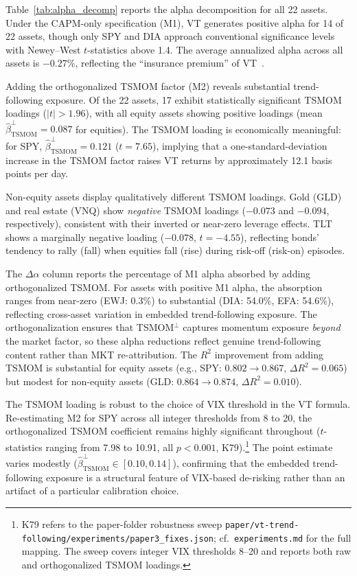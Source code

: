 Table~\ref{tab:alpha_decomp} reports the alpha decomposition for all 22 assets. Under the CAPM-only specification (M1), VT generates positive alpha for 14 of 22 assets, though only SPY and DIA approach conventional significance levels with Newey--West $t$-statistics above 1.4. The average annualized alpha across all assets is $-0.27\%$, reflecting the ``insurance premium'' of VT~\citep{lai2026a}.

Adding the orthogonalized TSMOM factor (M2) reveals substantial trend-following exposure. Of the 22 assets, 17 exhibit statistically significant TSMOM loadings ($|t| > 1.96$), with all equity assets showing positive loadings (mean $\hat{\beta}_{\text{TSMOM}}^{\perp} = 0.087$ for equities). The TSMOM loading is economically meaningful: for SPY, $\hat{\beta}_{\text{TSMOM}}^{\perp} = 0.121$ ($t = 7.65$), implying that a one-standard-deviation increase in the TSMOM factor raises VT returns by approximately 12.1 basis points per day.

Non-equity assets display qualitatively different TSMOM loadings. Gold (GLD) and real estate (VNQ) show \textit{negative} TSMOM loadings ($-0.073$ and $-0.094$, respectively), consistent with their inverted or near-zero leverage effects. TLT shows a marginally negative loading ($-0.078$, $t = -4.55$), reflecting bonds' tendency to rally (fall) when equities fall (rise) during risk-off (risk-on) episodes.

The $\Delta\alpha$ column reports the percentage of M1 alpha absorbed by adding orthogonalized TSMOM. For assets with positive M1 alpha, the absorption ranges from near-zero (EWJ: 0.3\%) to substantial (DIA: 54.0\%, EFA: 54.6\%), reflecting cross-asset variation in embedded trend-following exposure. The orthogonalization ensures that TSMOM$^{\perp}$ captures momentum exposure \textit{beyond} the market factor, so these alpha reductions reflect genuine trend-following content rather than MKT re-attribution. The $R^2$ improvement from adding TSMOM is substantial for equity assets (e.g., SPY: $0.802 \to 0.867$, $\Delta R^2 = 0.065$) but modest for non-equity assets (GLD: $0.864 \to 0.874$, $\Delta R^2 = 0.010$).

The TSMOM loading is robust to the choice of VIX threshold in the VT formula. Re-estimating M2 for SPY across all integer thresholds from 8 to 20, the orthogonalized TSMOM coefficient remains highly significant throughout ($t$-statistics ranging from 7.98 to 10.91, all $p < 0.001$, K79).\footnote{K79 refers to the paper-folder robustness sweep \texttt{paper/vt-trend-following/experiments/paper3\_fixes.json}; cf.~\texttt{experiments.md} for the full mapping. The sweep covers integer VIX thresholds 8--20 and reports both raw and orthogonalized TSMOM loadings.} The point estimate varies modestly ($\hat{\beta}_{\text{TSMOM}}^{\perp} \in [0.10, 0.14]$), confirming that the embedded trend-following exposure is a structural feature of VIX-based de-risking rather than an artifact of a particular calibration choice.


